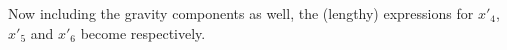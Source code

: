
Now including the gravity components as well, the (lengthy) expressions for $x'_{4}$, $x'_{5}$ and $x'_{6}$ become  respectively.

